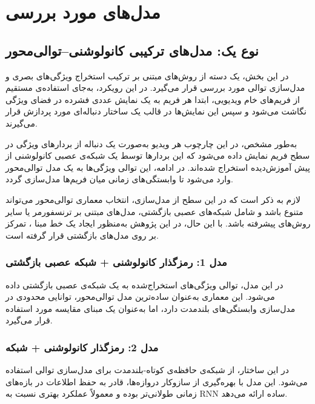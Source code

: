 \documentclass[12pt]{report}
\begin{document}
\clearpage
\section{مدل‌های مورد بررسی}
\subsection{نوع یک: مدل‌های ترکیبی کانولوشنی--توالی‌محور}
\label{sec:cnn_sequence_models}

در این بخش، یک دسته از روش‌های مبتنی بر ترکیب استخراج ویژگی‌های بصری و مدل‌سازی توالی مورد بررسی قرار می‌گیرد. در این رویکرد، به‌جای استفاده‌ی مستقیم از فریم‌های خام ویدیویی، ابتدا هر فریم به یک نمایش عددی فشرده در فضای ویژگی نگاشت می‌شود و سپس این نمایش‌ها در قالب یک ساختار دنباله‌ای مورد پردازش قرار می‌گیرند.

به‌طور مشخص، در این چارچوب هر ویدیو به‌صورت یک دنباله از بردارهای ویژگی در سطح فریم نمایش داده می‌شود که این بردارها توسط یک شبکه‌ی عصبی کانولوشنی از پیش آموزش‌دیده استخراج شده‌اند. در ادامه، این توالی ویژگی‌ها به یک مدل توالی‌محور  وارد می‌شود تا وابستگی‌های زمانی میان فریم‌ها مدل‌سازی گردد.

لازم به ذکر است که در این سطح از مدل‌سازی، انتخاب معماری توالی‌محور می‌تواند متنوع باشد و شامل شبکه‌های عصبی بازگشتی، مدل‌های مبتنی بر ترنسفورمر  یا سایر روش‌های پیشرفته باشد. با این حال، در این پژوهش به‌منظور ایجاد یک خط مبنا ، تمرکز بر روی مدل‌های بازگشتی قرار گرفته است.

\subsubsection{مدل 1: رمزگذار کانولوشنی + شبکه عصبی بازگشتی}
در این مدل، توالی ویژگی‌های استخراج‌شده به یک شبکه‌ی عصبی بازگشتی داده می‌شود. این معماری به‌عنوان ساده‌ترین مدل توالی‌محور، توانایی محدودی در مدل‌سازی وابستگی‌های بلندمدت دارد، اما به‌عنوان یک مبنای مقایسه مورد استفاده قرار می‌گیرد.

\subsubsection{مدل 2: رمزگذار کانولوشنی + شبکه }
در این ساختار، از شبکه‌ی حافظه‌ی کوتاه-بلندمدت برای مدل‌سازی توالی استفاده می‌شود. این مدل با بهره‌گیری از سازوکار دروازه‌ها، قادر به حفظ اطلاعات در بازه‌های زمانی طولانی‌تر بوده و معمولاً عملکرد بهتری نسبت به RNN ساده ارائه می‌دهد.
\end{document}
